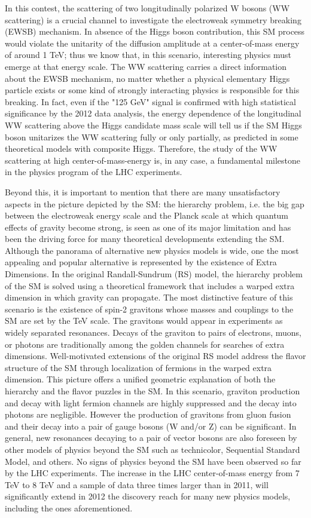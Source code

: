 \documentclass[10pt, a4paper]{article}
\begin{document}
In this contest, the scattering of two longitudinally polarized W bosons (WW scattering) is a crucial channel to investigate the electroweak symmetry breaking (EWSB) mechanism. In absence of the Higgs boson contribution, this SM process would violate the unitarity of the diffusion amplitude at a center-of-mass energy of around 1 TeV; thus we know that, in this scenario, interesting physics must emerge at that energy scale. The WW scattering carries a direct information about the EWSB mechanism, no matter whether a physical elementary Higgs particle exists or some kind of strongly interacting physics is responsible for this breaking. In fact, even if the "125 GeV" signal is confirmed with high statistical significance by the 2012 data analysis, the energy dependence of the longitudinal WW scattering above the Higgs candidate mass scale will tell us if the SM Higgs boson unitarizes the WW scattering fully or only partially, as predicted in some theoretical models with composite Higgs. Therefore, the study of the WW scattering at high center-of-mass-energy is, in any case, a fundamental milestone in the physics program of the LHC experiments.

Beyond this, it is important to mention that there are many unsatisfactory aspects in the picture depicted by the SM: the hierarchy problem, i.e. the big gap between the electroweak energy scale and the Planck scale at which quantum effects of gravity become strong, is seen as one of its major limitation and has been the driving force for many theoretical developments extending the SM. Although the panorama of alternative new physics models is wide, one the most appealing and popular alternative is represented by the existence of Extra Dimensions. 
In the original Randall-Sundrum (RS) model, the hierarchy problem of the SM is solved using a theoretical framework that includes a warped extra dimension in which gravity can propagate. The most distinctive feature of this scenario is the existence of spin-2 gravitons whose masses and couplings to the SM are set by the TeV scale. The gravitons would appear in experiments as widely separated resonances. Decays of the graviton to pairs of electrons, muons, or photons are traditionally among the golden channels for searches of extra dimensions. 
Well-motivated extensions of the original RS model address the flavor structure of the SM through localization of fermions in the warped extra dimension. This picture offers a unified geometric explanation of both the hierarchy and the flavor puzzles in the SM. In this scenario, graviton production and decay with light fermion channels are highly suppressed and the decay into photons are negligible. However the production of gravitons from gluon fusion and their decay into a pair of gauge bosons (W and/or Z) can be significant. In general, new resonances decaying to a pair of vector bosons are also foreseen by other models of physics beyond the SM such as technicolor, Sequential Standard Model, and others.
No signs of physics beyond the SM have been observed so far by the LHC experiments. The increase in the LHC center-of-mass energy from 7 TeV to 8 TeV and a sample of data three times larger than in 2011, will significantly extend in 2012 the discovery reach for many new physics models, including the ones aforementioned.
\end{document}
